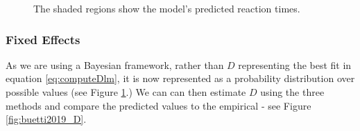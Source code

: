 \documentclass[smallextended]{svjour3}       %
\begin{document}
\begin{figure}
\centering
{}
\caption{The shaded regions show the model's predicted reaction times.}
\label{fig:buetti2019_a1}
\end{figure}

\subsubsection{Fixed Effects}

As we are using a Bayesian framework, rather than $D$ representing the best fit in equation \ref{eq:computeDlm}, it is now represented as a probability distribution over possible values (see Figure \ref{fig:buetti2019_a1}.) We can can then estimate $D$ using the three methods and compare the predicted values to the empirical - see Figure \ref{fig:buetti2019_D}.
\end{document}
